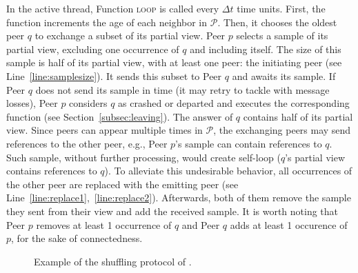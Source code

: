 In the active thread, Function \textsc{loop} is called every $\Delta t$ time
units. First, the function increments the age of each neighbor in
$\mathcal{P}$. Then, it chooses the oldest peer $q$ to exchange a subset of its
partial view.  Peer $p$ selects a sample of its partial view, excluding one
occurrence of $q$ and including itself. The size of this sample is half of its
partial view, with at least one peer: the initiating peer (see
Line~\ref{line:samplesize}).  It sends this subset to Peer $q$ and awaits its
sample. If Peer $q$ does not send its sample in time (it may retry to tackle
with message losses), Peer $p$ considers $q$ as crashed or departed and executes the
corresponding function (see Section~\ref{subsec:leaving}). The answer of $q$
contains half of its partial view. Since peers can appear multiple times in
$\mathcal{P}$, the exchanging peers may send references to the other peer, e.g.,
Peer $p$'s sample can contain references to $q$. Such sample, without further
processing, would create self-loop ($q$'s partial view contains references to
$q$). To alleviate this undesirable behavior, all occurrences of the other peer
are replaced with the emitting peer (see
Line~\ref{line:replace1},~\ref{line:replace2}).  Afterwards, both of them remove
the sample they sent from their view and add the received sample. It is worth
noting that Peer $p$ removes at least 1 occurrence of $q$ and Peer $q$ adds at
least 1 occurence of $p$, for the sake of connectedness.



\begin{figure*}
  \centering
  \hspace{10pt}
  \hspace{10pt}
  \caption{\label{fig:cyclicexample}Example of the shuffling
    protocol of \SPRAY. }
\end{figure*}

